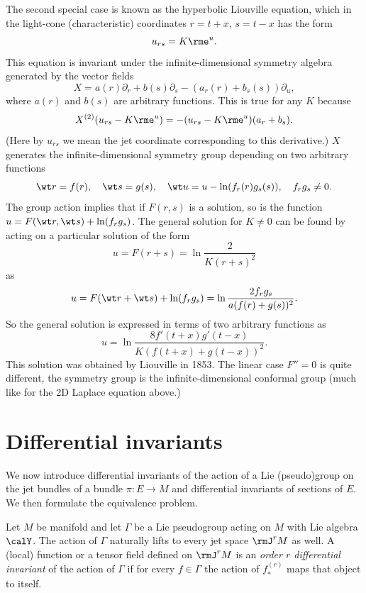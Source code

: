 \begin{example}
    The second special case is known as the hyperbolic Liouville equation, which in the light-cone (characteristic) coordinates $r=t+x$, $s=t-x$ has the form 
    \[u_{rs}=K\rme^u.\]
    This equation is invariant under the infinite-dimensional symmetry algebra generated by the vector fields 
    \[X=a(r)\partial_r+b(s)\partial_s-(a_r(r)+b_s(s))\partial_u,\]
    where $a(r)$ and $b(s)$ are arbitrary functions. This is true for any $K$ because 
    \[X^{(2)}(u_{rs}-K\rme^u)=-(u_{rs}-K\rme^u)(a_r+b_s).\]
    (Here by $u_{rs}$ we mean the jet coordinate corresponding to this derivative.) $X$ generates the infinite-dimensional symmetry group depending on two arbitrary functions 
    \[\wt r=f(r),\quad \wt s=g(s),\quad \wt u=u-\ln(f_r(r)g_s(s)),\quad f_rg_s\neq 0.\]
    The group action implies that if $F(r,s)$ is a solution, so is the function $u=F(\wt r,\wt s)+\ln(f_rg_s)$. The general solution for $K\neq 0$ can be found by acting on a particular solution of the form 
    \[u=F(r+s)=\ln\frac{2}{K(r+s)^2}\]
    as 
    \[u=F(\wt r+\wt s)+\ln (f_rg_s)=\ln\frac{2f_rg_s}{a(f(r)+g(s))^2}.\]
    So the general solution is expressed in terms of two arbitrary functions as
    \[u=\ln\frac{8 f'(t+x)g'(t-x)}{K(f(t+x)+g(t-x))^2}.\]
    This solution was obtained by Liouville in 1853. The linear case $F''=0$ is quite different, the symmetry group is the infinite-dimensional conformal group (much like for the 2D Laplace equation above.)
\end{example}






\section{Differential invariants}

We now introduce differential invariants of the action of a Lie (pseudo)group on the jet bundles of a bundle $\pi:E\to M$ and differential invariants of sections of $E$. We then formulate the equivalence problem. 


\begin{defn}
    Let $M$ be manifold and let $\Gamma$ be a Lie pseudogroup acting on $M$ with Lie algebra $\calY$. The action of $\Gamma$ naturally lifts to every jet space $\rmJ^r M$ as well. A (local) function or a tensor field defined on $\rmJ^r M$ is an \emph{order $r$ differential invariant} of the action of $\Gamma$ if for every $f\in\Gamma$ the action of $f^{(r)}_\ast$ maps that object to itself.
\end{defn}


